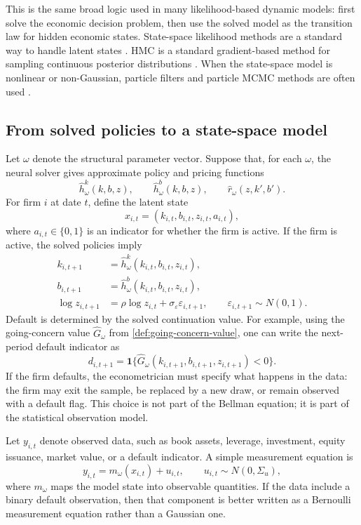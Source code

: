 \documentclass[11pt]{article}
\newcommand{\1}{\mathbf{1}}
\begin{document}
This is the same broad logic used in many likelihood-based dynamic models:
first solve the economic decision problem, then use the solved model as the
transition law for hidden economic states. State-space likelihood methods are a
standard way to handle latent states \citep{durbinkoopman2012ssm}. HMC is a
standard gradient-based method for sampling continuous posterior distributions
\citep{neal2011hmc}. When the state-space model is nonlinear or non-Gaussian,
particle filters and particle MCMC methods are often used
\citep{andrieu2010pmcmc}.

\subsection{From solved policies to a state-space model}

Let \(\omega\) denote the structural parameter vector. Suppose that, for each
\(\omega\), the neural solver gives approximate policy and pricing functions
\[
  \widehat h^k_\omega(k,b,z),\qquad
  \widehat h^b_\omega(k,b,z),\qquad
  \widehat r_\omega(z,k',b').
\]
For firm \(i\) at date \(t\), define the latent state
\[
  x_{i,t}=(k_{i,t},b_{i,t},z_{i,t},a_{i,t}),
\]
where \(a_{i,t}\in\{0,1\}\) is an indicator for whether the firm is active. If
the firm is active, the solved policies imply
\begin{align}
  k_{i,t+1}
  &=
  \widehat h^k_\omega(k_{i,t},b_{i,t},z_{i,t}), \label{eq:ssm-k-law}\\
  b_{i,t+1}
  &=
  \widehat h^b_\omega(k_{i,t},b_{i,t},z_{i,t}), \label{eq:ssm-b-law}\\
  \log z_{i,t+1}
  &=
  \rho \log z_{i,t}+\sigma_\varepsilon\varepsilon_{i,t+1},
  \qquad \varepsilon_{i,t+1}\sim N(0,1). \label{eq:ssm-z-law}
\end{align}
Default is determined by the solved continuation value. For example, using the
going-concern value \(\widehat G_\omega\) from \cref{def:going-concern-value},
one can write the next-period default indicator as
\begin{equation}
  d_{i,t+1}
  =
  \1\{\widehat G_\omega(k_{i,t+1},b_{i,t+1},z_{i,t+1})<0\}.
  \label{eq:ssm-default-indicator}
\end{equation}
If the firm defaults, the econometrician must specify what happens in the data:
the firm may exit the sample, be replaced by a new draw, or remain observed
with a default flag. This choice is not part of the Bellman equation; it is part
of the statistical observation model.

Let \(y_{i,t}\) denote observed data, such as book assets, leverage, investment,
equity issuance, market value, or a default indicator. A simple measurement
equation is
\begin{equation}
  y_{i,t}
  =
  m_\omega(x_{i,t})+u_{i,t},
  \qquad
  u_{i,t}\sim N(0,\Sigma_u),
  \label{eq:ssm-measurement}
\end{equation}
where \(m_\omega\) maps the model state into observable quantities. If the data
include a binary default observation, then that component is better written as
a Bernoulli measurement equation rather than a Gaussian one.
\end{document}
